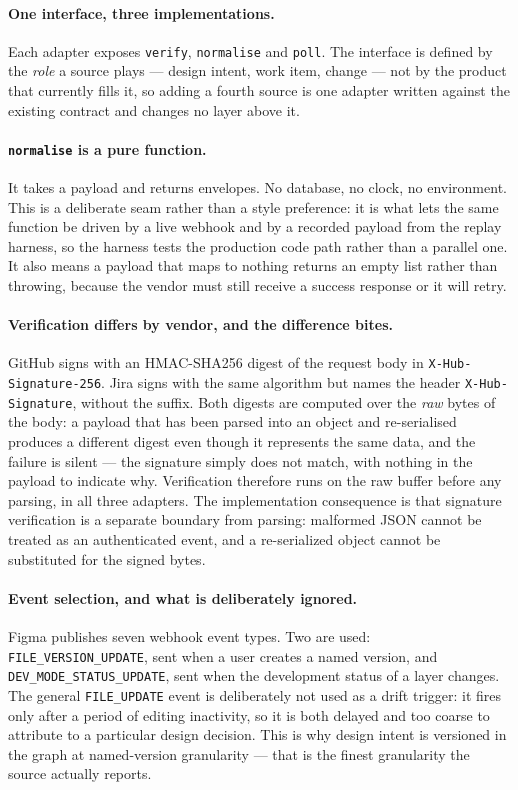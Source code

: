 \paragraph{One interface, three implementations.} Each adapter exposes
\texttt{verify}, \texttt{normalise} and \texttt{poll}. The interface is defined
by the \emph{role} a source plays --- design intent, work item, change --- not
by the product that currently fills it, so adding a fourth source is one
adapter written against the existing contract and changes no layer above it.

\paragraph{\texttt{normalise} is a pure function.} It takes a payload and
returns envelopes. No database, no clock, no environment. This is a deliberate
seam rather than a style preference: it is what lets the same function be
driven by a live webhook and by a recorded payload from the replay harness, so
the harness tests the production code path rather than a parallel one. It also
means a payload that maps to nothing returns an empty list rather than throwing,
because the vendor must still receive a success response or it will retry.

\paragraph{Verification differs by vendor, and the difference bites.}
GitHub signs with an HMAC-SHA256 digest of the request body in
\texttt{X-Hub-\allowbreak{}Signature-256}. Jira signs with the same algorithm
but names the header \texttt{X-Hub-\allowbreak{}Signature}, without the suffix.
Both digests are computed over the \emph{raw} bytes of the body: a payload that
has been parsed into an object and re-serialised produces a different digest
even though it represents the same data, and the failure is silent --- the
signature simply does not match, with nothing in the payload to indicate why.
Verification therefore runs on the raw buffer before any parsing, in all three
adapters.
The implementation consequence is that signature verification is a separate
boundary from parsing: malformed JSON cannot be treated as an authenticated
event, and a re-serialized object cannot be substituted for the signed bytes.

\paragraph{Event selection, and what is deliberately ignored.} Figma publishes
seven webhook event types. Two are used: \texttt{FILE\_VERSION\_UPDATE}, sent
when a user creates a named version, and
\texttt{DEV\_MODE\_STATUS\_UPDATE}, sent when the development status of a layer
changes. The general \texttt{FILE\_UPDATE} event is deliberately not used as a
drift trigger: it fires only after a period of editing inactivity, so it is
both delayed and too coarse to attribute to a particular design decision. This
is why design intent is versioned in the graph at named-version granularity ---
that is the finest granularity the source actually reports.

